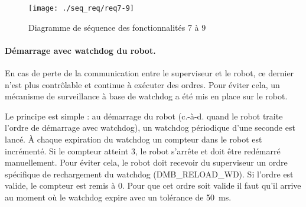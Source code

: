 \begin{figure}[htbp]
\begin{center}
\texttt{[image: ./seq\_req/req7-9]}
\caption{Diagramme de séquence des fonctionnalités 7 à 9}
\label{fig:diag7_9}
\end{center}
\end{figure}
\FloatBarrier

\paragraph{Démarrage avec watchdog du robot.} En cas de perte de la communication entre le superviseur et le robot, ce dernier n'est plus contrôlable et continue à exécuter des ordres. Pour éviter cela, un mécanisme de surveillance à base de watchdog a été mis en place sur le robot.

Le principe est simple : au démarrage du robot (c.-à-d. quand le robot traite l'ordre de démarrage avec watchdog), un watchdog périodique d'une seconde est lancé. \`A chaque expiration du watchdog un compteur dans le robot est incrémenté. Si le compteur atteint 3, le robot s'arrête et doit être redémarré manuellement.  Pour éviter cela, le robot doit recevoir du superviseur un ordre spécifique de rechargement du watchdog (DMB\_RELOAD\_WD). Si l'ordre est valide, le compteur est remis à 0. Pour que cet ordre soit valide il faut qu'il arrive au moment où le watchdog expire avec un tolérance de 50~ms. \\


%
%

